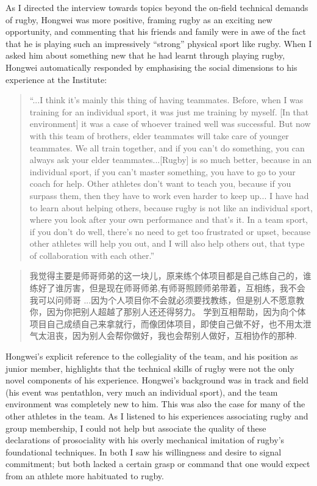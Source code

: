 \begin{CJK}{UTF8}{gbsn}
As I directed the interview towards topics beyond the on-field technical demands of rugby, Hongwei was more positive, framing rugby as an exciting new opportunity, and commenting that his friends and family were in awe of the fact that he is playing such an impressively ``strong'' physical sport like rugby.  When I asked him about something new that he had learnt through playing rugby, Hongwei automatically responded by emphasising the social dimensions to his experience at the Institute:

  \begin{quotation}
    ``...I think it's mainly this thing of having teammates. Before, when I was training for an individual sport, it was just me training by myself. [In that environment] it was a case of whoever trained well was successful.  But now with this team of brothers, elder teammates will take care of younger teammates. We all train together, and if you can’t do something, you can always ask your elder teammates...[Rugby] is so much better, because in an individual sport, if you can't master something, you have to go to your coach for help. Other athletes don't want to teach you, because if you surpass them, then they have to work even harder to keep up... I have had to learn about helping others, because rugby is not like an individual sport, where you look after your own performance and that's it.  In a team sport, if you don't do well, there's no need to get too frustrated or upset, because other athletes will help you out, and I will also help others out, that type of collaboration with each other.''
  \end{quotation}

\begin{CJK}{UTF8}{gbsn}
  \begin{quotation}
    我觉得主要是师哥师弟的这一块儿，原来练个体项目都是自己练自己的，谁练好了谁厉害，但是现在师哥师弟,有师哥照顾师弟带着，互相练，我不会我可以问师哥
    ...因为个人项目你不会就必须要找教练，但是别人不愿意教你，因为你把别人超越了那别人还还得努力。 学到互相帮助，因为向个体项目自己成绩自己来拿就行，而像团体项目，即使自己做不好，也不用太泄气太沮丧，因为别人会帮你做好，我也会帮别人做好，互相协作的那种.
  \end{quotation}
\end{CJK}

Hongwei's explicit reference to the collegiality of the team, and his position as junior member, highlights that the technical skills of rugby were not the only novel components of his experience.  Hongwei's background was in track and field (his event was pentathlon, very much an individual sport), and the team environment was completely new to him.  This was also the case for many of the other athletes in the team.  As I listened to his experiences associating rugby and group membership, I could not help but associate the quality of these declarations of prosociality with his overly mechanical imitation of rugby's foundational techniques.  In both I saw his willingness and desire to signal commitment; but both lacked a certain grasp or command that one would expect from an athlete more habituated to rugby.


\end{CJK}
